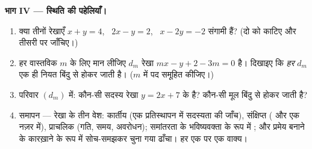\begin{problem}
\medskip
\noindent\textbf{भाग IV --- स्थिति की पहेलियाँ।}
\begin{enumerate}[resume]
  \item क्या तीनों रेखाएँ $x + y = 4$, \ $2x - y = 2$, \ $x - 2y = -2$ संगामी हैं? (दो को काटिए
        और तीसरी पर जाँचिए।)
  \item हर वास्तविक $m$ के लिए मान लीजिए $d_m$ रेखा $mx - y + 2 - 3m = 0$ है। दिखाइए कि
        \emph{हर} $d_m$ एक ही नियत बिंदु से होकर जाती है। ($m$ में पद
        समूहित कीजिए।)
  \item परिवार $(d_m)$ में: कौन-सी सदस्य रेखा $y = 2x + 7$ के  है? कौन-सी मूल
        बिंदु से होकर जाती है?
  \item समापन --- रेखा के तीन वेश: कार्तीय (एक प्रतिस्थापन में सदस्यता की
        जाँच), संक्षिप्त ( और  एक नज़र में), प्राचलिक (गति, समय,
        अवरोधन); समांतरता के भविष्यवक्ता के रूप में ; और प्रमेय बनाने
        के कारख़ाने के रूप में सोच-समझकर चुना गया ढाँचा। हर एक पर एक वाक्य।
\end{enumerate}
\end{problem}
